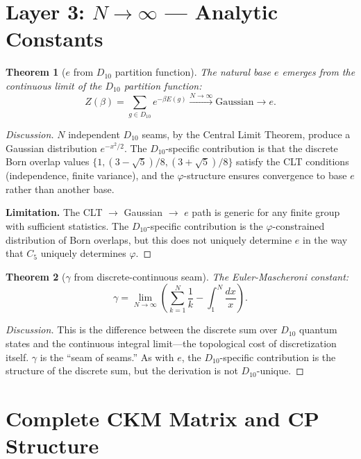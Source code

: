 \documentclass[11pt,a4paper]{article}
\newtheorem{theorem}{Theorem}
\begin{document}
\section{Layer 3: $N \to \infty$ --- Analytic Constants}
\label{sec:layer3}

\begin{theorem}[$e$ from $D_{10}$ partition function]
The natural base $e$ emerges from the continuous limit of the $D_{10}$ partition function:
\[
Z(\beta) = \sum_{g \in D_{10}} e^{-\beta E(g)} \xrightarrow{N \to \infty} \text{Gaussian} \longrightarrow e.
\]
\end{theorem}

\begin{proof}[Discussion]
$N$ independent $D_{10}$ seams, by the Central Limit Theorem, produce a Gaussian distribution $e^{-x^2/2}$. The $D_{10}$-specific contribution is that the discrete Born overlap values $\{1, (3-\sqrt{5})/8, (3+\sqrt{5})/8\}$ satisfy the CLT conditions (independence, finite variance), and the $\varphi$-structure ensures convergence to base $e$ rather than another base.

\textbf{Limitation.} The CLT $\to$ Gaussian $\to$ $e$ path is generic for any finite group with sufficient statistics. The $D_{10}$-specific contribution is the $\varphi$-constrained distribution of Born overlaps, but this does not uniquely determine $e$ in the way that $C_5$ uniquely determines $\varphi$.
\end{proof}

\begin{theorem}[$\gamma$ from discrete-continuous seam]
The Euler-Mascheroni constant:
\[
\gamma = \lim_{N\to\infty}\left(\sum_{k=1}^{N}\frac{1}{k} - \int_1^N \frac{dx}{x}\right).
\]
\end{theorem}

\begin{proof}[Discussion]
This is the difference between the discrete sum over $D_{10}$ quantum states and the continuous integral limit---the topological cost of discretization itself. $\gamma$ is the ``seam of seams.'' As with $e$, the $D_{10}$-specific contribution is the structure of the discrete sum, but the derivation is not $D_{10}$-unique.
\end{proof}

\section{Complete CKM Matrix and CP Structure}
\label{sec:ckm}
\end{document}
